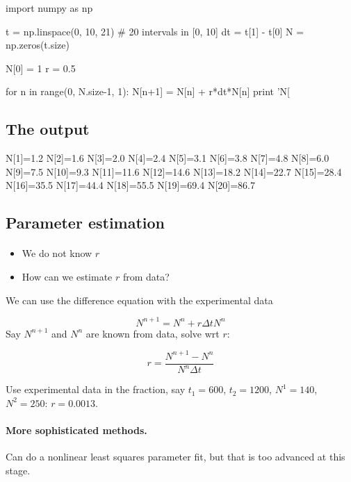 \documentclass[%
twoside,                 %
final,                   %
10pt]{article}
\begin{document}
\bpypro
import numpy as np

t = np.linspace(0, 10, 21)  # 20 intervals in [0, 10]
dt = t[1] - t[0]
N = np.zeros(t.size)

N[0] = 1
r = 0.5

for n in range(0, N.size-1, 1):
    N[n+1] = N[n] + r*dt*N[n]
    print 'N[%
\epypro



\subsection{The output}

\bccq
N[1]=1.2
N[2]=1.6
N[3]=2.0
N[4]=2.4
N[5]=3.1
N[6]=3.8
N[7]=4.8
N[8]=6.0
N[9]=7.5
N[10]=9.3
N[11]=11.6
N[12]=14.6
N[13]=18.2
N[14]=22.7
N[15]=28.4
N[16]=35.5
N[17]=44.4
N[18]=55.5
N[19]=69.4
N[20]=86.7
\eccq

\subsection{Parameter estimation}


\paragraph{}
\begin{itemize}
 \item We do not know $r$

 \item How can we estimate $r$ from data?
\end{itemize}

\noindent
We can use the difference equation with the experimental data

\[ N^{n+1} = N^n + r\Delta t N^n\]
Say $N^{n+1}$ and $N^n$ are known from data, solve wrt $r$:

\[ r = \frac{N^{n+1}-N^n}{N^n\Delta t} \]

Use experimental data in the fraction, say $t_1=600$, $t_2=1200$,
$N^1=140$, $N^2=250$: $r=0.0013$.




\paragraph{More sophisticated methods.}
Can do a nonlinear least squares parameter fit, but that is
too advanced at this stage.
\end{document}
